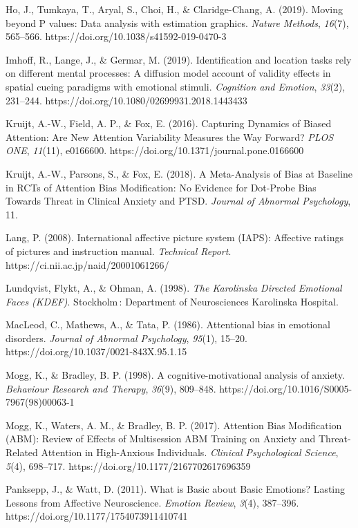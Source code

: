 \documentclass{article}
\begin{document}
Ho, J., Tumkaya, T., Aryal, S., Choi, H., \& Claridge-Chang, A. (2019). Moving beyond P values: Data analysis with estimation graphics. \emph{Nature Methods}, \emph{16}(7), 565--566. https://doi.org/10.1038/s41592-019-0470-3

Imhoff, R., Lange, J., \& Germar, M. (2019). Identification and location tasks rely on different mental processes: A diffusion model account of validity effects in spatial cueing paradigms with emotional stimuli. \emph{Cognition and Emotion}, \emph{33}(2), 231--244. https://doi.org/10.1080/02699931.2018.1443433

Kruijt, A.-W., Field, A. P., \& Fox, E. (2016). Capturing Dynamics of Biased Attention: Are New Attention Variability Measures the Way Forward? \emph{PLOS ONE}, \emph{11}(11), e0166600. https://doi.org/10.1371/journal.pone.0166600

Kruijt, A.-W., Parsons, S., \& Fox, E. (2018). A Meta-Analysis of Bias at Baseline in RCTs of Attention Bias Modification: No Evidence for Dot-Probe Bias Towards Threat in Clinical Anxiety and PTSD. \emph{Journal of Abnormal Psychology}, 11.

Lang, P. (2008). International affective picture system (IAPS): Affective ratings of pictures and instruction manual. \emph{Technical Report}. https://ci.nii.ac.jp/naid/20001061266/

Lundqvist, Flykt, A., \& Ohman, A. (1998). \emph{The Karolinska Directed Emotional Faces (KDEF)}. Stockholm : Department of Neurosciences Karolinska Hospital.

MacLeod, C., Mathews, A., \& Tata, P. (1986). Attentional bias in emotional disorders. \emph{Journal of Abnormal Psychology}, \emph{95}(1), 15--20. https://doi.org/10.1037/0021-843X.95.1.15

Mogg, K., \& Bradley, B. P. (1998). A cognitive-motivational analysis of anxiety. \emph{Behaviour Research and Therapy}, \emph{36}(9), 809--848. https://doi.org/10.1016/S0005-7967(98)00063-1

Mogg, K., Waters, A. M., \& Bradley, B. P. (2017). Attention Bias Modification (ABM): Review of Effects of Multisession ABM Training on Anxiety and Threat-Related Attention in High-Anxious Individuals. \emph{Clinical Psychological Science}, \emph{5}(4), 698--717. https://doi.org/10.1177/2167702617696359

Panksepp, J., \& Watt, D. (2011). What is Basic about Basic Emotions? Lasting Lessons from Affective Neuroscience. \emph{Emotion Review}, \emph{3}(4), 387--396. https://doi.org/10.1177/1754073911410741
\end{document}
